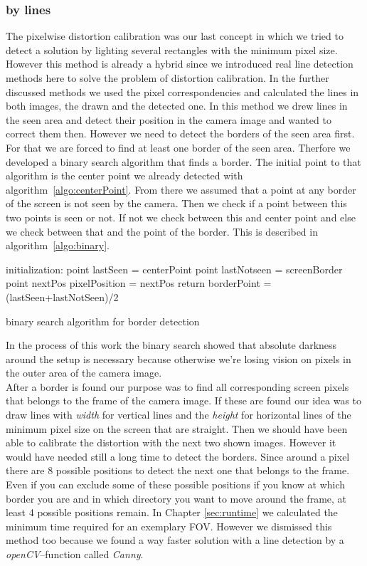\documentclass[journal,final,a4paper,twoside]{PS}
\begin{document}
\subsubsection{by lines}
The pixelwise distortion calibration was our last concept in which we tried to detect a solution by lighting several rectangles with the minimum pixel size. However this method is already a hybrid since we introduced real line detection methods here to solve the problem of distortion calibration. In the further discussed methods we used the pixel correspondencies and calculated the lines in both images, the drawn and the detected one. In this method we drew lines in the seen area and detect their position in the camera image and wanted to correct them then. However we need to detect the borders of the seen area first. For that we are forced to find at least one border of the seen area. Therfore we developed a binary search algorithm that finds a border. The initial point to that algorithm is the center point we already detected with algorithm~\ref{algo:centerPoint}. From there we assumed that a point at any border of the screen is not seen by the camera. Then we check if a point between this two points is seen or not. If not we check between this and center point and else we check between that and the point of the border. This is described in algorithm~\ref{algo:binary}. 


\begin{algorithm}[h]
 initialization: \;
 point lastSeen = centerPoint\;
 point lastNotseen = screenBorder\;
 point nextPos\;
 pixelPosition = nextPos\;
 return borderPoint = (lastSeen+lastNotSeen)/2\;
 \caption{binary search algorithm for border detection}
 \label{algo:binary}
\end{algorithm} 
In the process of this work the binary search showed that absolute darkness around the setup is necessary because otherwise we're losing vision on pixels in the outer area of the camera image. \\After a border is found our purpose was to find all corresponding screen pixels that belongs to the frame of the camera image. If these are found our idea was to draw lines with \emph{width} for vertical lines and the \emph{height} for horizontal lines of the minimum pixel size on the screen that are straight. Then we should have been able to calibrate the distortion with the next two shown images. However it would have needed still a long time to detect the borders. Since around a pixel there are 8 possible positions to detect the next one that belongs to the frame. Even if you can exclude some of these possible positions if you know at which border you are and in which directory you want to move around the frame, at least 4 possible positions remain. %
In Chapter \ref{sec:runtime} we calculated the minimum time required for an exemplary FOV. However we dismissed this method too because we found a way faster solution with a line detection by a \emph{openCV}--function called \emph{Canny}. 
\end{document}
